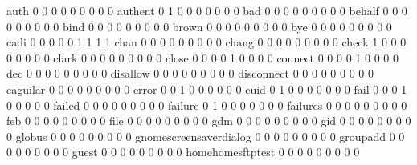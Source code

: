 \documentclass[compress,8pt]{beamer}
\begin{document}
\begin{frame}
\begin{Schunk}
  auth                                       0   0   0   0   0   0   0   0   0
  authent                                    0   1   0   0   0   0   0   0   0
  bad                                        0   0   0   0   0   0   0   0   0
  behalf                                     0   0   0   0   0   0   0   0   0
  bind                                       0   0   0   0   0   0   0   0   0
  brown                                      0   0   0   0   0   0   0   0   0
  bye                                        0   0   0   0   0   0   0   0   0
  cadi                                       0   0   0   0   0   1   1   1   1
  chan                                       0   0   0   0   0   0   0   0   0
  chang                                      0   0   0   0   0   0   0   0   0
  check                                      1   0   0   0   0   0   0   0   0
  clark                                      0   0   0   0   0   0   0   0   0
  close                                      0   0   0   0   1   0   0   0   0
  connect                                    0   0   0   0   1   0   0   0   0
  dec                                        0   0   0   0   0   0   0   0   0
  disallow                                   0   0   0   0   0   0   0   0   0
  disconnect                                 0   0   0   0   0   0   0   0   0
  eaguilar                                   0   0   0   0   0   0   0   0   0
  error                                      0   0   1   0   0   0   0   0   0
  euid                                       0   1   0   0   0   0   0   0   0
  fail                                       0   0   0   1   0   0   0   0   0
  failed                                     0   0   0   0   0   0   0   0   0
  failure                                    0   1   0   0   0   0   0   0   0
  failures                                   0   0   0   0   0   0   0   0   0
  feb                                        0   0   0   0   0   0   0   0   0
  file                                       0   0   0   0   0   0   0   0   0
  gdm                                        0   0   0   0   0   0   0   0   0
  gid                                        0   0   0   0   0   0   0   0   0
  globus                                     0   0   0   0   0   0   0   0   0
  gnomescreensaverdialog                     0   0   0   0   0   0   0   0   0
  groupadd                                   0   0   0   0   0   0   0   0   0
  guest                                      0   0   0   0   0   0   0   0   0
  homehomesftptest                           0   0   0   0   0   0   0   0   0

\end{Schunk}
\end{frame}
\end{document}
